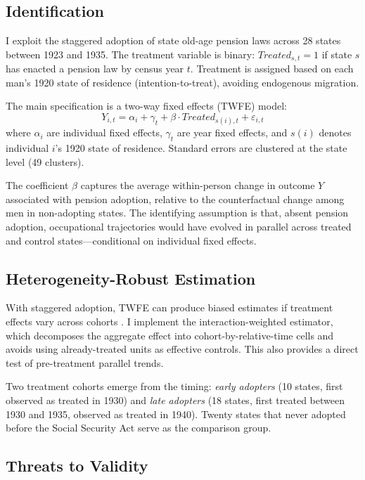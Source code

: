 \documentclass[12pt]{article}
\begin{document}
\subsection{Identification}

I exploit the staggered adoption of state old-age pension laws across 28 states between 1923 and 1935. The treatment variable is binary: $Treated_{s,t} = 1$ if state $s$ has enacted a pension law by census year $t$. Treatment is assigned based on each man's 1920 state of residence (intention-to-treat), avoiding endogenous migration.

The main specification is a two-way fixed effects (TWFE) model:
\begin{equation}
Y_{i,t} = \alpha_i + \gamma_t + \beta \cdot Treated_{s(i),t} + \varepsilon_{i,t}
\label{eq:twfe}
\end{equation}
where $\alpha_i$ are individual fixed effects, $\gamma_t$ are year fixed effects, and $s(i)$ denotes individual $i$'s 1920 state of residence. Standard errors are clustered at the state level (49 clusters).

The coefficient $\beta$ captures the average within-person change in outcome $Y$ associated with pension adoption, relative to the counterfactual change among men in non-adopting states. The identifying assumption is that, absent pension adoption, occupational trajectories would have evolved in parallel across treated and control states---conditional on individual fixed effects.

\subsection{Heterogeneity-Robust Estimation}

With staggered adoption, TWFE can produce biased estimates if treatment effects vary across cohorts \citep{goodman2021}. I implement the \citet{sunAbraham2021} interaction-weighted estimator, which decomposes the aggregate effect into cohort-by-relative-time cells and avoids using already-treated units as effective controls. This also provides a direct test of pre-treatment parallel trends.

Two treatment cohorts emerge from the timing: \textit{early adopters} (10 states, first observed as treated in 1930) and \textit{late adopters} (18 states, first treated between 1930 and 1935, observed as treated in 1940). Twenty states that never adopted before the Social Security Act serve as the comparison group.

\subsection{Threats to Validity}
\end{document}
